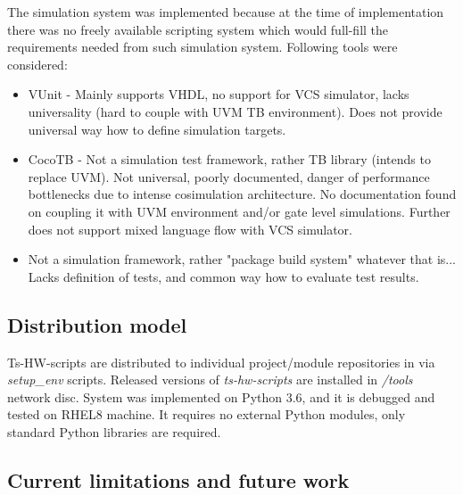 \documentclass{tropic_design_spec}
\begin{document}
The simulation system was implemented because at the time of implementation there
was no freely available scripting system which would full-fill the requirements
needed from such simulation system. Following tools were considered:
\begin{itemize}
    \item{VUnit - Mainly supports VHDL, no support for VCS simulator, lacks
          universality (hard to couple with UVM TB environment). Does not
          provide universal way how to define simulation targets.}
    \item{CocoTB - Not a simulation test framework, rather TB library
          (intends to replace UVM). Not universal, poorly documented, danger
          of performance bottlenecks due to intense cosimulation architecture.
          No documentation found on coupling it with UVM environment and/or
          gate level simulations. Further does not support mixed language
          flow with VCS simulator.}
    \item{Not a simulation framework, rather "package build system" whatever
          that is... Lacks definition of tests, and common way how to evaluate
          test results.}
 
\end{itemize}


\subsection*{Distribution model}

Ts-HW-scripts are distributed to individual project/module repositories in
via \textit{setup_env} scripts. Released versions of \textit{ts-hw-scripts}
are installed in \textit{/tools} network disc. System was implemented on Python
3.6, and it is debugged and tested on RHEL8 machine. It requires no external
Python modules, only standard Python libraries are required.


\subsection*{Current limitations and future work}


\end{document}
